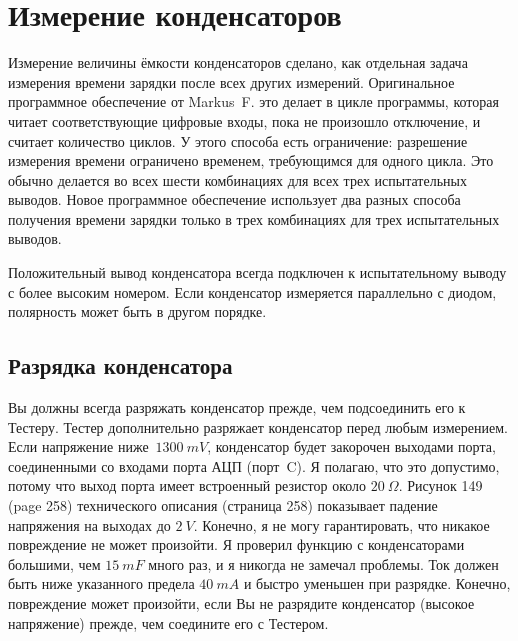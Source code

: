 \section{Измерение конденсаторов}
Измерение величины ёмкости конденсаторов сделано, как отдельная задача измерения времени зарядки после всех других 
измерений. Оригинальное программное обеспечение от Markus~F. это делает в цикле программы, которая читает 
соответствующие цифровые входы, пока не произошло отключение, и считает количество циклов. У этого способа есть 
ограничение: разрешение измерения времени ограничено временем, требующимся для одного цикла. Это обычно делается 
во всех шести комбинациях для всех трех испытательных выводов. Новое программное обеспечение использует два разных 
способа получения времени зарядки только в трех комбинациях для трех испытательных выводов.

Положительный вывод конденсатора всегда подключен к испытательному выводу с более высоким номером. Если конденсатор 
измеряется параллельно с диодом, полярность может быть в другом порядке.

\subsection{Разрядка конденсатора}
Вы должны всегда разряжать конденсатор прежде, чем подсоединить его к Тестеру. Тестер дополнительно разряжает 
конденсатор перед любым измерением. Если напряжение ниже~\(1300~mV\), конденсатор будет закорочен выходами порта, 
соединенными со входами порта АЦП (порт~C). Я полагаю, что это допустимо, потому что выход порта имеет встроенный 
резистор около \(20~\Omega\).
Рисунок 149 (page 258) технического описания (страница 258) \cite{ATmega8} показывает падение 
напряжения на выходах до \(2~V\). Конечно, я не могу гарантировать, что никакое повреждение не может произойти. 
Я проверил функцию с конденсаторами большими, чем \(15~mF\) много раз, и я никогда не замечал проблемы. Ток должен 
быть ниже указанного предела \(40~mA\) и быстро уменьшен при разрядке. Конечно, повреждение может произойти, если Вы 
не разрядите конденсатор (высокое напряжение) прежде, чем соедините его с Тестером. 

